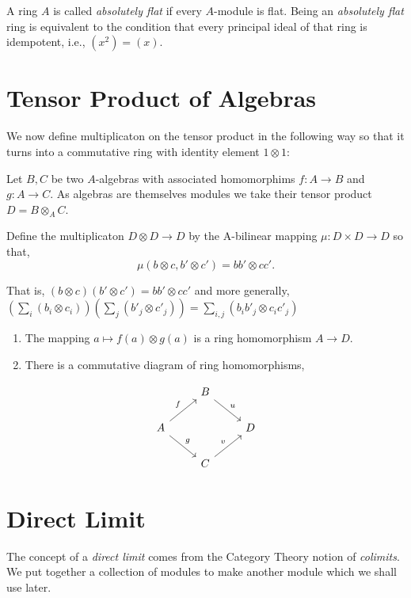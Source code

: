 \documentclass[]{report}
\begin{document}
A ring $A$ is called \textit{absolutely flat} if every $A$-module is flat. Being an \textit{absolutely flat} ring is equivalent to the condition that every principal ideal of that ring is idempotent, i.e., $(x^2) = (x)$.



\section{Tensor Product of Algebras}

We now define multiplicaton on the tensor product in the following way so that it turns into a commutative ring with identity element $1\otimes 1$:

Let $B,C$ be two $A$-algebras with associated homomorphims $f:A\rightarrow B$ and $g:A\rightarrow C$. As algebras are themselves modules we take their tensor product $D = B\otimes_A C$. 

Define the multiplicaton $D\otimes D \rightarrow D$ by the A-bilinear mapping $\mu: D\times D \rightarrow D$ so that,
$$\mu(b\otimes c, b'\otimes c') = bb' \otimes cc'. $$


That is, $(b\otimes c)(b'\otimes c') = bb'\otimes cc'$ and more generally, $(\sum_i(b_i\otimes c_i))(\sum_j(b'_j\otimes c'_j)) = \sum_{i,j}(b_i b'_j \otimes c_i c'_j)$
\begin{enumerate}
    \item The mapping $a\mapsto f(a)\otimes g(a)$ is a ring homomorphism $A\rightarrow D$. 
    \item There is a commutative diagram of ring homomorphisms, 
\end{enumerate}

\begin{equation*}
    \begin{tikzcd}
                                  & B \arrow[rd, "u"] &   \\
        A \arrow[ru, "f"] \arrow[rd, "g"] &                   & D \\
                                  & C \arrow[ru, "v"] &  
    \end{tikzcd}
\end{equation*}


\section{Direct Limit}

The concept of a \textit{direct limit} comes from the Category Theory notion of \textit{colimits}. We put together a collection of modules to make another module which we shall use later.
\end{document}
